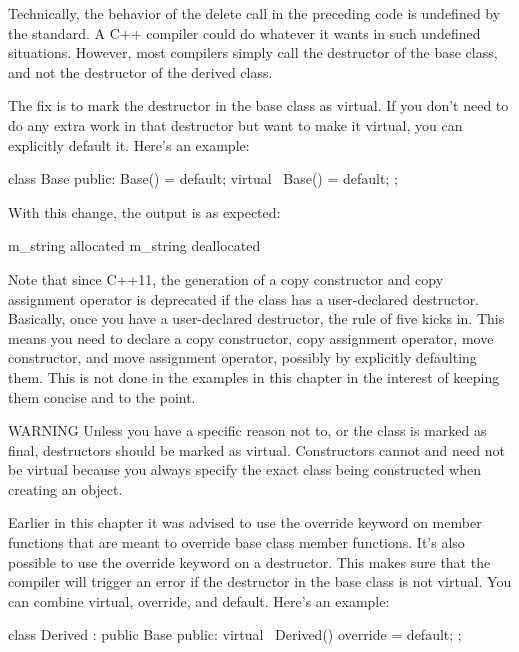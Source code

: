 Technically, the behavior of the delete call in the preceding code is undefined by the standard. A C++ compiler could do whatever it wants in such undefined situations. However, most compilers simply call the destructor of the base class, and not the destructor of the derived class.

The fix is to mark the destructor in the base class as virtual. If you don’t need to do any extra work in that destructor but want to make it virtual, you can explicitly default it. Here’s an example:

\begin{cpp}
class Base
{
    public:
        Base() = default;
        virtual ~Base() = default;
};
\end{cpp}

With this change, the output is as expected:

\begin{shell}
m_string allocated
m_string deallocated
\end{shell}

Note that since C++11, the generation of a copy constructor and copy assignment operator is deprecated if the class has a user-declared destructor. Basically, once you have a user-declared destructor, the rule of five kicks in. This means you need to declare a copy constructor, copy assignment operator, move constructor, and move assignment operator, possibly by explicitly defaulting them. This is not done in the examples in this chapter in the interest of keeping them concise and to the point.

\begin{myWarning}{WARNING}
Unless you have a specific reason not to, or the class is marked as final, destructors should be marked as virtual. Constructors cannot and need not be virtual because you always specify the exact class being constructed when creating an object.
\end{myWarning}

Earlier in this chapter it was advised to use the override keyword on member functions that are meant to override base class member functions. It’s also possible to use the override keyword on a destructor. This makes sure that the compiler will trigger an error if the destructor in the base class is not virtual. You can combine virtual, override, and default. Here’s an example:

\begin{cpp}
class Derived : public Base
{
    public:
        virtual ~Derived() override = default;
};
\end{cpp}

